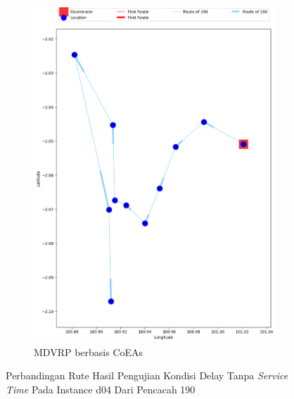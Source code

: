 \begin{figure}[H]
	\centering
	\begin{subfigure}[t]{\textwidth}
		\centering
		\includegraphics[width=\textwidth]{Resources/Images/delayed_4/real_m15_n100_delayed_4_190_coes}
		\caption{MDVRP berbasis CoEAs}
		\label{fig:real_m15_n100_delayed_4_190_coes}
	\end{subfigure}
	\caption{Perbandingan Rute Hasil Pengujian Kondisi Delay Tanpa \textit{Service Time} Pada Instance d04 Dari Pencacah 190}
	\label{fig:real_m15_n100_delayed_4_190}
\end{figure}


